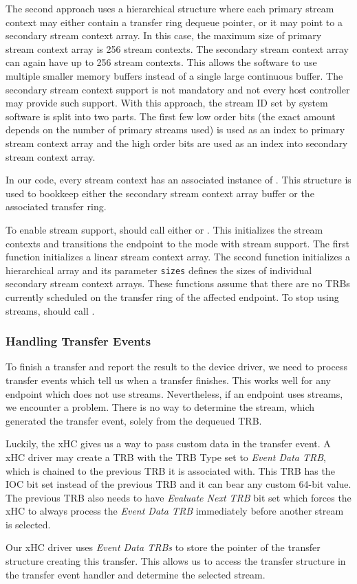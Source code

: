 The second approach uses a hierarchical structure where each primary stream
context may either contain a transfer ring dequeue pointer, or it may point to
a secondary stream context array. In this case, the maximum size of primary
stream context array is 256 stream contexts. The secondary stream context array
can again have up to 256 stream contexts. This allows the software to use
multiple smaller memory buffers instead of a single large continuous buffer. The
secondary stream context support is not mandatory and not every host controller
may provide such support. With this approach, the stream ID set by system
software is split into two parts. The first few low order bits (the exact
amount depends on the number of primary streams used) is used as an index to
primary stream context array and the high order bits are used as an index into
secondary stream context array.

In our code, every stream context has an associated instance of
. This structure is used to bookkeep either the
secondary stream context array buffer or the associated transfer ring.

To enable stream support,  should call either
 or
. This initializes the stream
contexts and transitions the endpoint to the mode with stream support. The
first function initializes a linear stream context array. The second function
initializes a hierarchical array and its parameter \texttt{sizes} defines the
sizes of individual secondary stream context arrays. These functions assume
that there are no TRBs currently scheduled on the transfer ring of the affected
endpoint. To stop using streams,  should call
.

\subsubsection{Handling Transfer Events}

To finish a transfer and report the result to the device driver, we need to
process transfer events which tell us when a transfer finishes. This works well
for any endpoint which does not use streams. Nevertheless, if an endpoint uses
streams, we encounter a problem. There is no way to determine the stream, which
generated the transfer event, solely from the dequeued TRB.

Luckily, the xHC gives us a way to pass custom data in the transfer event.
A xHC driver may create a TRB with the TRB Type set to
\textit{Event Data TRB}, which is chained to the previous TRB it is associated
with. This TRB has the IOC bit set instead of the previous TRB and it can bear
any custom 64-bit value. The previous TRB also needs to have
\textit{Evaluate Next TRB} bit set which forces the xHC to always process the
\textit{Event Data TRB} immediately before another stream is selected.

Our xHC driver uses \textit{Event Data TRBs} to store the pointer of the transfer
structure creating this transfer. This allows us to access the transfer
structure in the transfer event handler and determine the selected stream.
